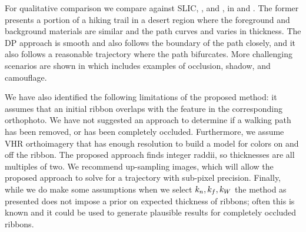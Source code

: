 For qualitative comparison we compare against \ac{SLIC}, \ActiveContours{}, and \GrabCut{}, in  and .  The former presents a portion of a hiking trail in a desert region where the foreground and background materials are similar and the path curves and varies in thickness. The \ac{DP} approach is smooth and also follows the boundary of the path closely, and it also follows a reasonable trajectory where the path bifurcates. More challenging scenarios are shown in  which includes examples of occlusion, shadow, and camouflage.  

We have also identified the following limitations of the proposed method: it assumes that an initial ribbon overlaps with the feature in the corresponding orthophoto. We have not suggested an approach to determine if a walking path has been removed, or has been completely occluded. Furthermore, we assume \ac{VHR} orthoimagery that has enough resolution to build a model for colors on and off the ribbon. The proposed approach finds integer raddii, so thicknesses are all multiples of two. We recommend up-sampling images, which will allow the proposed approach to solve for a trajectory with sub-pixel precision. Finally, while we do make some assumptions when we select $k_n{}, k_f{}, k_W{}$ the method as presented does not impose a prior on expected thickness of ribbons; often this is known and it could be used to generate plausible results for completely occluded ribbons. 



